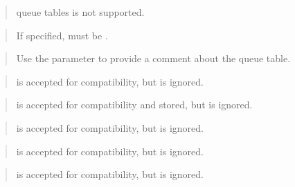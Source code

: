 \documentclass[letterpaper,10pt,english,openany,oneside]{sphinxmanual}
\begin{document}
\begin{quote}

 queue tables is not supported.
\end{quote}

\begin{quote}

If specified,  must be .
\end{quote}

\begin{quote}

Use the  parameter to provide a comment about the queue
table.
\end{quote}

\begin{quote}

 is accepted for compatibility, but is ignored.
\end{quote}

\begin{quote}

 is accepted for compatibility and stored, but is
ignored.
\end{quote}

\begin{quote}

 is accepted for compatibility, but is ignored.
\end{quote}

\begin{quote}

 is accepted for compatibility, but is ignored.
\end{quote}

\begin{quote}

 is accepted for compatibility, but is ignored.
\end{quote}
\end{document}
